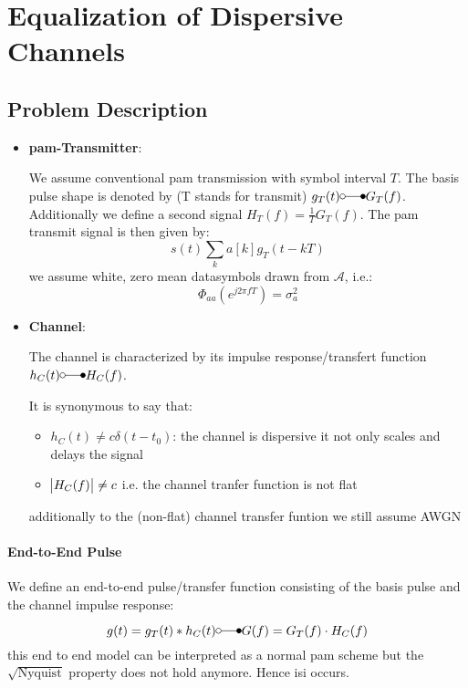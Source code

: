 \chapter{Equalization of Dispersive Channels}
\section{Problem Description}
\begin{itemize}
    \item \textbf{\ac{pam}-Transmitter}:

        We assume conventional \ac{pam} transmission with symbol interval $T$.
        The basis pulse shape is denoted by (T stands for transmit)
        $g_T(t) \laplace G_T(f)$. Additionally we define a second signal
        $H_T(f) = \frac{1}{T} G_T(f)$. The \ac{pam} transmit signal
        is then given by:
        \begin{equation}
            s(t) \sum_k a[k] g_T(t - kT)
        \end{equation}
        we assume white, zero mean datasymbols drawn from $\mathcal{A}$, i.e.:
        \begin{equation}
            \Phi_{aa}(e^{j 2 \pi f T}) = \sigma_a^2
        \end{equation}

    \item \textbf{Channel}:
        
        The channel is characterized by its impulse response/transfert function
        $h_C(t) \laplace H_C(f)$. 

        It is synonymous to say that:
        \begin{itemize}
            \item $h_C(t) \neq c \delta(t-t_0)$: the channel is dispersive it not only
                scales and delays the signal
            \item $\abs{H_C(f)} \neq c$ i.e. the channel tranfer function is not flat
        \end{itemize}
        additionally to the (non-flat) channel transfer funtion we still assume AWGN
\end{itemize}

\subsubsection{End-to-End Pulse}
We define an end-to-end pulse/transfer function consisting of the basis pulse and the
channel impulse response:
\begin{equation}
    g(t) = g_T(t) * h_C(t) \laplace G(f) = G_T(f) \cdot H_C(f)
\end{equation}
this end to end model can be interpreted as a normal \ac{pam} scheme but the $\sqrt{\text{
Nyquist}}$ property does not hold anymore. Hence \ac{isi} occurs.

